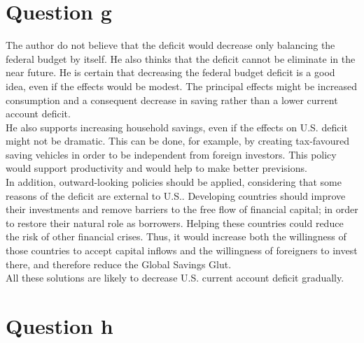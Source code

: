 \documentclass[	11pt, ]{fphw}
\begin{document}
\section*{Question g}
The author do not believe that the deficit would decrease only balancing the federal budget by itself. He also thinks that the deficit cannot be eliminate in the near future. 
He is certain that decreasing the federal budget deficit is a good idea, even if the effects would be modest. The principal effects might be increased consumption and a consequent decrease in saving rather than a lower current account deficit. \\
He also supports increasing household savings, even if the effects on U.S. deficit might not be dramatic. This can be done, for example, by creating tax-favoured saving vehicles in order to be independent from foreign investors. This policy would support productivity and would help to make better previsions.  \\
In addition, outward-looking policies should be applied, considering that some reasons of the deficit are external to U.S.. Developing countries should improve their investments and remove barriers to the free flow of financial capital; in order to restore their natural role as borrowers. Helping these countries could reduce the risk of other financial crises. Thus, it would increase both the willingness of those countries to accept capital inflows and the willingness of foreigners to invest there, and therefore reduce the Global Savings Glut. \\
All these solutions are likely to decrease U.S. current account deficit gradually. 


\section*{Question h} 
\end{document}
